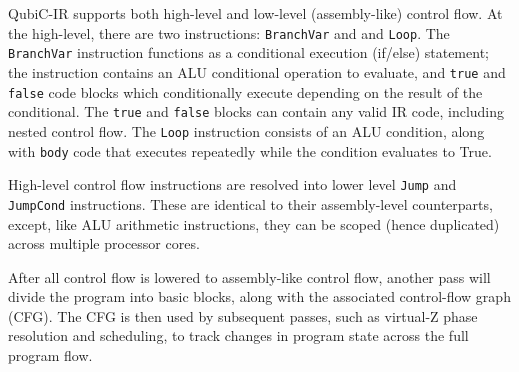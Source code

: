 \documentclass[journal]{IEEEtran}
\begin{document}
QubiC-IR supports both high-level and low-level (assembly-like) control flow. At the high-level, there are two instructions: \verb|BranchVar| and and \verb|Loop|. The \verb|BranchVar| instruction functions as a conditional execution (if/else) statement; the instruction contains an ALU conditional operation to evaluate, and \verb|true| and \verb|false| code blocks which conditionally execute depending on the result of the conditional. The \verb|true| and \verb|false| blocks can contain any valid IR code, including nested control flow. The \verb|Loop| instruction consists of an ALU condition, along with \verb|body| code that executes repeatedly while the condition evaluates to True.

High-level control flow instructions are resolved into lower level \verb|Jump| and \verb|JumpCond| instructions. These are identical to their assembly-level counterparts, except, like ALU arithmetic instructions, they can be scoped (hence duplicated) across multiple processor cores.

After all control flow is lowered to assembly-like control flow, another pass will divide the program into basic blocks, along with the associated control-flow graph (CFG). The CFG is then used by subsequent passes, such as virtual-Z phase resolution and scheduling, to track changes in program state across the full program flow.
\end{document}

